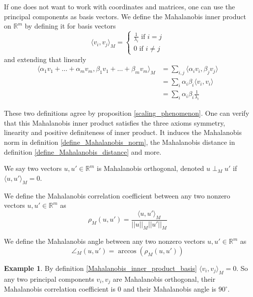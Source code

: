 \documentclass[11pt]{amsart}
\theoremstyle{definition}
\newtheorem{example}[theorem]{Example}
\begin{document}
If one does not want to work with coordinates and matrices, one can use the principal components as basis vectors.
\dfn \label{Mahalanobis_inner_product_basis} We define the Mahalanobis inner product on $\mathbb{R}^m$ by defining it for basis vectors
$$\langle v_i, v_j \rangle_M = \begin{cases} \frac{1}{\lambda_i} \text{ if } i = j \\ 0 \text{ if } i \neq j \end{cases}$$
and extending that linearly
\begin{align*}
\langle \alpha_1 v_1 + \dots + \alpha_m v_m, \beta_1 v_1 + \dots + \beta_m v_m \rangle_M & = \sum\limits_{i, j} \langle \alpha_i v_i, \beta_j v_j \rangle \\
 & = \sum\limits_i \alpha_i \beta_i \langle v_i, v_i \rangle \\
 & = \sum\limits_i \alpha_i \beta_i \frac{1}{\lambda_i}
\end{align*}

These two definitions agree by proposition \ref{scaling_phenomenon}. One can verify that this Mahalanobis inner product satisfies the three axioms symmetry, linearity and positive definiteness of inner product. It induces the Mahalanobis norm in definition \ref{define_Mahalanobis_norm}, the Mahalanobis distance in definition \ref{define_Mahalanobis_distance} and more.

\dfn We say two vectors $u, u' \in \mathbb{R}^m$ is Mahalanobis orthogonal, denoted $u \perp_M u'$ if $\langle u, u' \rangle_M = 0$.

\dfn We define the Mahalanobis correlation coefficient between any two nonzero vectors $u, u' \in \mathbb{R}^m$ as
$$\rho_M(u, u') = \frac{\langle u, u' \rangle_M}{||u||_M ||u'||_M}$$

\dfn We define the Mahalanobis angle between any two nonzero vectors $u, u' \in \mathbb{R}^m$ as
$$\angle_M(u, u') = \arccos(\rho_M(u, u'))$$

\begin{example} \label{Mahalanobis_ortho_corr_angle} By definition \ref{Mahalanobis_inner_product_basis} $\langle v_i, v_j \rangle_M = 0$. So any two principal components $v_i, v_j$ are Mahalanobis orthogonal, their Mahalanobis correlation coefficient is 0 and their Mahalanobis angle is $90^{\circ}$.
\end{example}
\end{document}
